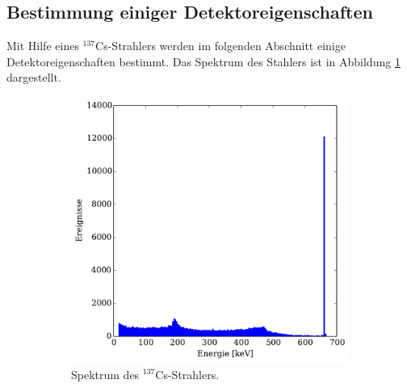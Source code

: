 \subsection{Bestimmung einiger Detektoreigenschaften} %
\label{sub:detektoreigenschaften}
Mit Hilfe eines $^{137}$Cs-Strahlers werden im folgenden Abschnitt einige
Detektoreigenschaften bestimmt.
Das Spektrum des Stahlers ist in Abbildung \ref{fig:cs_spektrum} dargestellt.
\begin{figure}[htb]
    \centering
    \begin{subfigure}{0.49\linewidth}
        \centering
        \includegraphics[width=1.0\linewidth]{img/06_caesium.pdf}
        \caption{
            Spektrum des $^{137}$Cs-Strahlers.
        }
        \label{fig:cs_spektrum}
    \end{subfigure}
    \begin{subfigure}{0.49\linewidth}
        \centering

\end{subfigure}
\end{figure}

